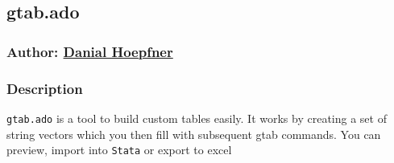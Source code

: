 \documentclass[11pt]{article}
\begin{document}
{\begin{lstlisting}[language=Stata, numbers=none]
\end{lstlisting}

\subsection{gtab.ado}
\subsubsection{Author: \href{mailto:dhoepfner@gibsonconsult.com}{Danial Hoepfner}}
\subsubsection{Description}
\texttt{gtab.ado} is a tool to build custom tables easily. It works by creating a set of string vectors which you then fill with subsequent gtab commands. You can preview, import into \texttt{Stata} or export to excel
}
\end{document}

